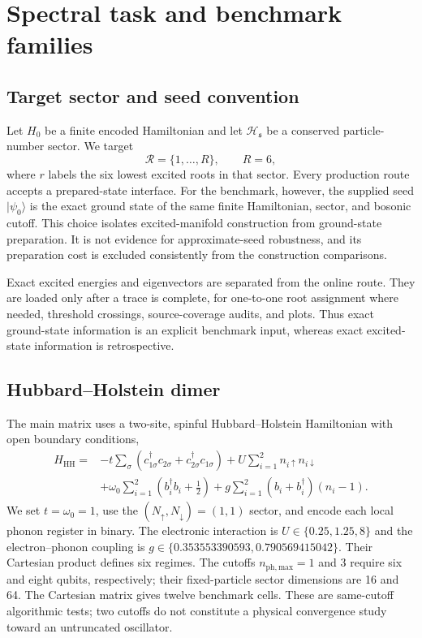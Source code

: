 \documentclass[
  reprint,
  amsmath,
  amssymb,
  aps,
  pra,
  nofootinbib,
  superscriptaddress,
  floatfix
]{revtex4-2}
\newcommand{\ket}[1]{|#1\rangle}
\newcommand{\mathcalR}{\mathcal{R}}
\newcommand{\phmax}{n_{\mathrm{ph,max}}}
\begin{document}
\section{Spectral task and benchmark families}
\label{sec:benchmark_task}

\subsection{Target sector and seed convention}

Let $H_0$ be a finite encoded Hamiltonian and let $\mathcal H_{\mathfrak s}$
be a conserved particle-number sector.  We target
\begin{equation}
  \mathcalR=\{1,\ldots,R\},\qquad R=6,
  \label{eq:target_set_intro}
\end{equation}
where $r$ labels the six lowest excited roots in that sector.  Every
production route accepts a prepared-state interface.  For the benchmark,
however, the supplied seed $\ket{\psi_0}$ is the exact ground state of the
same finite Hamiltonian, sector, and bosonic cutoff.  This choice isolates
excited-manifold construction from ground-state preparation.  It is not
evidence for approximate-seed robustness, and its preparation cost is
excluded consistently from the construction comparisons.

Exact excited energies and eigenvectors are separated from the online route.
They are loaded only after a trace is complete, for one-to-one root
assignment where needed, threshold crossings, source-coverage audits, and
plots.  Thus exact ground-state information is an explicit benchmark input,
whereas exact excited-state information is retrospective.

\subsection{Hubbard--Holstein dimer}
\label{sec:hh_model}

The main matrix uses a two-site, spinful Hubbard--Holstein Hamiltonian with
open boundary conditions,
\begin{align}
 H_{\mathrm{HH}}
 =&-t\sum_{\sigma}
 \left(c_{1\sigma}^{\dagger}c_{2\sigma}
 +c_{2\sigma}^{\dagger}c_{1\sigma}\right)
 +U\sum_{i=1}^{2}n_{i\uparrow}n_{i\downarrow}
 \nonumber\\
 &+\omega_0\sum_{i=1}^{2}\left(b_i^{\dagger}b_i+\frac12\right)
 +g\sum_{i=1}^{2}(b_i+b_i^{\dagger})(n_i-1) .
 \label{eq:hh_hamiltonian}
\end{align}
We set $t=\omega_0=1$, use the $(N_\uparrow,N_\downarrow)=(1,1)$
sector, and encode each local phonon register in binary.  The electronic
interaction is $U\in\{0.25,1.25,8\}$ and the electron--phonon coupling is
$g\in\{0.353553390593,0.790569415042\}$.  Their Cartesian product defines
six regimes.  The cutoffs $\phmax=1$ and $3$ require six and eight qubits,
respectively; their fixed-particle sector dimensions are 16 and 64.  The
Cartesian matrix gives twelve benchmark cells.  These are same-cutoff
algorithmic tests; two cutoffs do not constitute a physical convergence
study toward an untruncated oscillator.
\end{document}
